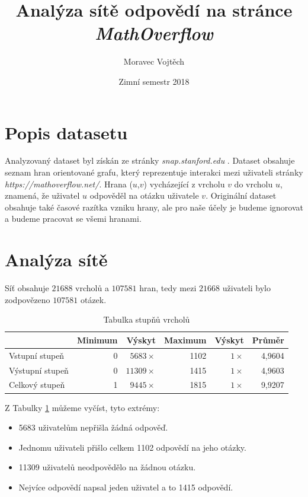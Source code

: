 \documentclass[a4paper,12pt]{article}
\author{Moravec Vojtěch}
\title{Analýza sítě odpovědí na stránce \emph{MathOverflow}}
\date{Zimní semestr 2018}
\begin{document}
\maketitle
\newpage

\section{Popis datasetu}

Analyzovaný dataset byl získán ze stránky \emph{snap.stanford.edu} \cite{snapnets}. Dataset obsahuje
seznam hran orientované grafu, který reprezentuje interakci mezi uživateli stránky
 \emph{https://mathoverflow.net/}. Hrana ($u$,$v$) vycházející z vrcholu $v$ do vrcholu $u$, znamená, že
 uživatel $u$ odpověděl na otázku uživatele $v$. Originální dataset obsahuje také časové razítka vzniku
 hrany, ale pro naše účely je budeme ignorovat a budeme pracovat se všemi hranami.
 
\section{Analýza sítě}
Síť obsahuje $21 688$ vrcholů a $107 581$ hran, tedy mezi $21 668$ uživateli bylo 
zodpovězeno $107 581$ otázek.

\begin{table}[h!]
\centering
\begin{tabular}{l | r | r | r | r | r}
 				& Minimum & Výskyt	& Maximum & Výskyt	& Průměr \\
\hline
Vstupní stupeň 	& 0 & $5683 \times$	& 1102 	& 	$1 \times$	& 4,9604 \\
Výstupní stupeň & 0 & $11309 \times$& 1415 	& 	$1 \times$	& 4,9603 \\
Celkový stupeň  & 1	& $9445 \times$	& 1815	&	$1 \times$	& 9,9207
\end{tabular}
\caption{Tabulka stupňů vrcholů}
\label{tab:degree}
\end{table}

Z Tabulky \ref{tab:degree} můžeme vyčíst, tyto extrémy:
\begin{itemize}
\item 5683 uživatelům nepřišla žádná odpověď.
\item Jednomu uživateli přišlo celkem 1102 odpovědí na jeho otázky.
\item 11309 uživatelů neodpovědělo na žádnou otázku.
\item Nejvíce odpovědí napsal jeden uživatel a to 1415 odpovědí.
\end{itemize}
\end{document}
